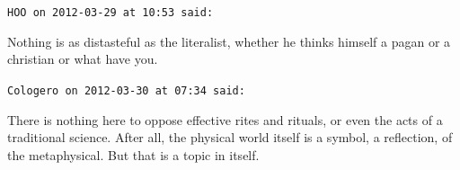 \begin{footnotesize}
\begin{sffamily}
\hfill

\texttt{HOO on 2012-03-29 at 10:53 said:}

Nothing is as distasteful as the literalist, whether he thinks himself a pagan or a christian or what have you.

\hfill

\texttt{Cologero on 2012-03-30 at 07:34 said:}

There is nothing here to oppose effective rites and rituals, or even the acts of a traditional science. After all, the physical world itself is a symbol, a reflection, of the metaphysical. But that is a topic in itself.

\end{sffamily}
\end{footnotesize}


